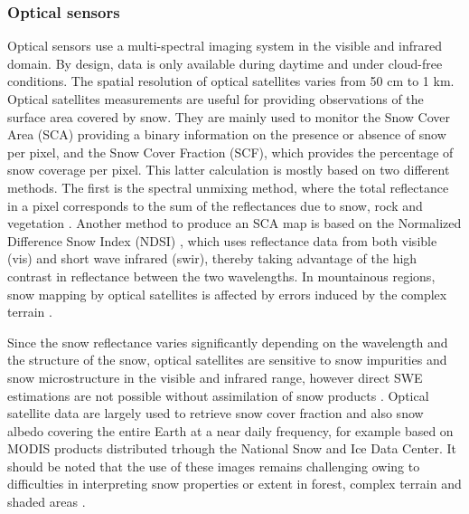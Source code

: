 \documentclass[utf8]{frontiersSCNS} %
\begin{document}
\subsubsection{Optical sensors} 



Optical sensors use a multi-spectral imaging system in the visible and infrared domain. By design, data is only available during daytime and under cloud-free conditions. The spatial resolution of optical satellites varies from 50 cm to 1 km. Optical satellites measurements are useful for providing observations of the surface area covered by snow. They are mainly used to monitor the Snow Cover Area (SCA) providing a binary information on the presence or absence of snow per pixel, and the Snow Cover Fraction (SCF), which provides the percentage of snow coverage per pixel. This latter calculation is mostly based on two different methods. The first is the spectral unmixing method, where the total reflectance in a pixel corresponds to the sum of the reflectances due to snow, rock and vegetation \citep[e.g.][]{Painter_2009,Sirguey_2009}. Another method to produce an SCA map is based on the Normalized Difference Snow Index (NDSI) \citep{Dozier_1989, Hall_1995}, which uses reflectance data from both visible (vis) and short wave infrared (swir), thereby taking advantage of the high contrast in reflectance between the two wavelengths. In mountainous regions, snow mapping by optical satellites is affected by errors induced by the complex terrain \citep{Masson_2018}.  

Since the snow reflectance varies significantly depending on the wavelength and the structure of the snow, optical satellites are sensitive to snow impurities and snow microstructure in the visible and infrared range, however direct SWE estimations are not possible without assimilation of snow products \citep{Mary_2013}. Optical satellite data are largely used to retrieve snow cover fraction and also snow albedo covering the entire Earth at a near daily frequency, for example based on MODIS products \citep{Klein_2002} distributed trhough the National Snow and Ice Data Center. It should be noted that the use of these images remains challenging owing to difficulties in interpreting snow properties or extent in forest, complex terrain and shaded areas \citep{Rittger_2013}.
\end{document}
